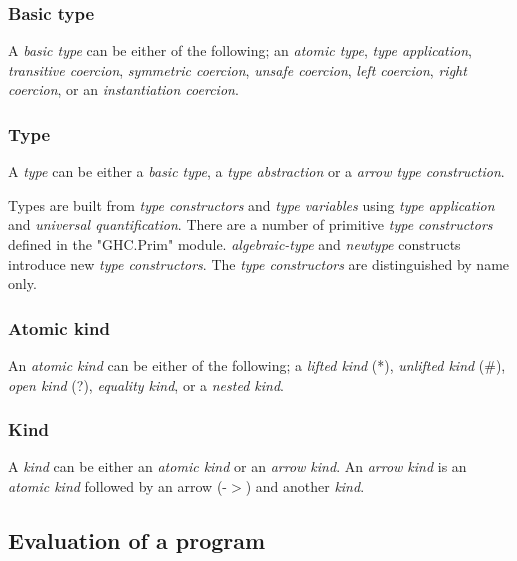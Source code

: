 \subsubsection{Basic type}

A \emph{basic type} can be either of the following; an \emph{atomic type}, 
\emph{type application}, \emph{transitive coercion}, \emph{symmetric coercion},
\emph{unsafe coercion}, \emph{left coercion}, \emph{right coercion}, or an
\emph{instantiation coercion}.\cite{tolmach2010ghc}




\subsubsection{Type}

A \emph{type} can be either a \emph{basic type}, a \emph{type abstraction} or a
\emph{arrow type construction}.

Types are built from \emph{type constructors} and \emph{type variables} using
\emph{type application} and \emph{universal quantification}. There are a number
of primitive \emph{type constructors} defined in the "GHC.Prim" module. 
\emph{algebraic-type} and \emph{newtype} constructs introduce new 
\emph{type constructors}. The \emph{type constructors} are distinguished by name
only.\cite{tolmach2010ghc}





\subsubsection{Atomic kind}

An \emph{atomic kind} can be either of the following; a \emph{lifted kind} (*), 
\emph{unlifted kind} (\#{}), \emph{open kind} (?), \emph{equality kind}, or a
\emph{nested kind}.\cite{tolmach2010ghc}





\subsubsection{Kind}

A \emph{kind} can be either an \emph{atomic kind} or an \emph{arrow kind}.
An \emph{arrow kind} is an \emph{atomic kind} followed by an arrow (-$>$) and
another \emph{kind}.\cite{tolmach2010ghc}





\subsection{Evaluation of a program}

